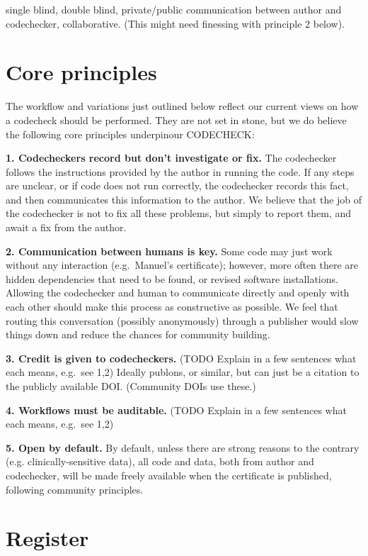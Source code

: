 \documentclass[12pt]{article}
\begin{document}
single blind, double blind, private/public communication between author
and codechecker, collaborative. (This might need finessing with
principle 2 below).

\section*{Core principles}\label{core-principles}

The workflow and variations just outlined below reflect our current
views on how a codecheck should be performed. They are not set in
stone, but we do believe the following core principles underpinour
CODECHECK:

\textbf{1. Codecheckers record but don't investigate or fix.} The
codechecker follows the instructions provided by the author in running
the code. If any steps are unclear, or if code does not run correctly,
the codechecker records this fact, and then communicates this
information to the author. We believe that the job of the codechecker is
not to fix all these problems, but simply to report them, and await a
fix from the author.

\textbf{2. Communication between humans is key.} Some code may just work
without any interaction (e.g.~Manuel's certificate); however, more often
there are hidden dependencies that need to be found, or revised software
installations. Allowing the codechecker and human to communicate
directly and openly with each other should make this process as
constructive as possible. We feel that routing this conversation
(possibly anonymously) through a publisher would slow things down and
reduce the chances for community building.

\textbf{3. Credit is given to codecheckers.} (TODO Explain in a few
sentences what each means, e.g.~see 1,2) Ideally publons, or similar,
but can just be a citation to the publicly available DOI. (Community
DOIs use these.)

\textbf{4. Workflows must be auditable.} (TODO Explain in a few
sentences what each means, e.g.~see 1,2)

\textbf{5. Open by default.}  By default, unless there are strong
reasons to the contrary (e.g. clinically-sensitive data), all code and
data, both from author and codechecker, will be made freely available
when the certificate is published, following community principles.


\section*{Register}\label{register}
\end{document}
